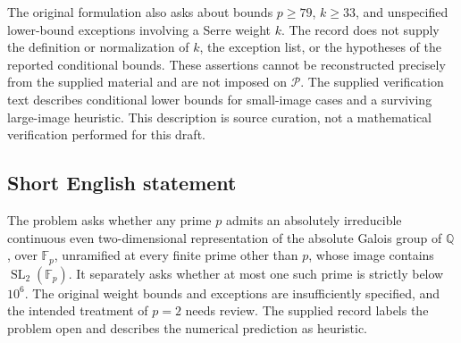 \documentclass[11pt]{article}
\newcommand{\Q}{\mathbb{Q}}
\newcommand{\F}{\mathbb{F}}
\begin{document}
The original formulation also asks about bounds \(p\ge79\), \(k\ge33\), and unspecified lower-bound exceptions involving a Serre weight \(k\). The record does not supply the definition or normalization of \(k\), the exception list, or the hypotheses of the reported conditional bounds. These assertions cannot be reconstructed precisely from the supplied material and are not imposed on \(\mathcal P\). The supplied verification text describes conditional lower bounds for small-image cases and a surviving large-image heuristic. This description is source curation, not a mathematical verification performed for this draft.
\subsection{Short English statement}
The problem asks whether any prime \(p\) admits an absolutely irreducible continuous even two-dimensional representation of the absolute Galois group of \(\Q\), over \(\F_p\), unramified at every finite prime other than \(p\), whose image contains \(\operatorname{SL}_2(\F_p)\). It separately asks whether at most one such prime is strictly below \(10^6\). The original weight bounds and exceptions are insufficiently specified, and the intended treatment of \(p=2\) needs review. The supplied record labels the problem open and describes the numerical prediction as heuristic.
\end{document}
